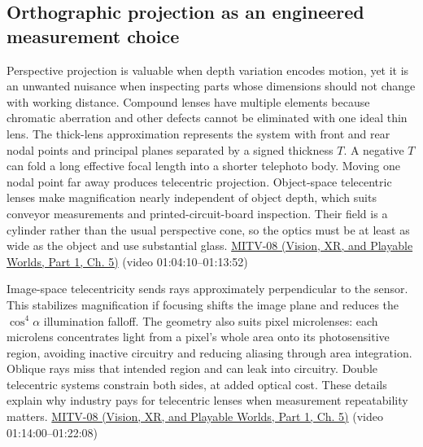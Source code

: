 \subsection{Orthographic projection as an engineered measurement choice}\label{03-visual-computing-i-ch003-orthographic-projection-as-an-engineered-measurement-choice}

\hypertarget{03-visual-computing-i-ch003-orthographic-projection-as-an-engineered-measurement-choice}{}

Perspective projection is valuable when depth variation encodes motion, yet it is an unwanted nuisance when inspecting parts whose dimensions should not change with working distance. Compound lenses have multiple elements because chromatic aberration and other defects cannot be eliminated with one ideal thin lens. The thick-lens approximation represents the system with front and rear nodal points and principal planes separated by a signed thickness \(T\). A negative \(T\) can fold a long effective focal length into a shorter telephoto body. Moving one nodal point far away produces telecentric projection. Object-space telecentric lenses make magnification nearly independent of object depth, which suits conveyor measurements and printed-circuit-board inspection. Their field is a cylinder rather than the usual perspective cone, so the optics must be at least as wide as the object and use substantial glass. \href{../07-Vision-XR-and-Playable-Worlds-P01/main.pdf\#nameddest=04-visual-computing-ii-ch036-mitv-08---shading-special-cases-lunar-surface-scanning-electron-microscope-greens-theorem}{MITV-08 (Vision, XR, and Playable Worlds, Part 1, Ch. 5)} (video 01:04:10--01:13:52)

Image-space telecentricity sends rays approximately perpendicular to the sensor. This stabilizes magnification if focusing shifts the image plane and reduces the \(\cos^4\alpha\) illumination falloff. The geometry also suits pixel microlenses: each microlens concentrates light from a pixel's whole area onto its photosensitive region, avoiding inactive circuitry and reducing aliasing through area integration. Oblique rays miss that intended region and can leak into circuitry. Double telecentric systems constrain both sides, at added optical cost. These details explain why industry pays for telecentric lenses when measurement repeatability matters. \href{../07-Vision-XR-and-Playable-Worlds-P01/main.pdf\#nameddest=04-visual-computing-ii-ch036-mitv-08---shading-special-cases-lunar-surface-scanning-electron-microscope-greens-theorem}{MITV-08 (Vision, XR, and Playable Worlds, Part 1, Ch. 5)} (video 01:14:00--01:22:08)

